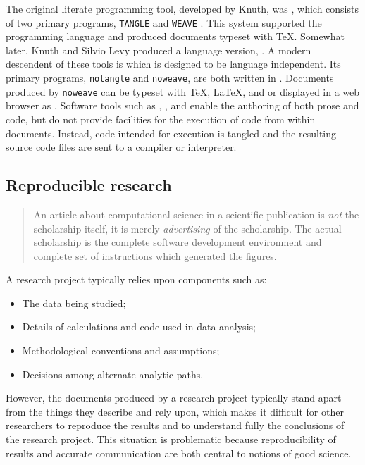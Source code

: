 \documentclass[article,shortnames]{jss}
\begin{document}
The original literate programming tool, developed by Knuth, was ,
which consists of two primary programs, \texttt{TANGLE} and \texttt{WEAVE}
\citep{web}.  This system supported the  programming language
and produced documents typeset with \TeX{}.  Somewhat later, Knuth and
Silvio Levy produced a  language version, 
\citep{knuth94:_cweb_system_struc_docum}.  A modern descendent of
these tools is  \citep{noweb} which is designed to be language
independent.  Its primary programs, \texttt{notangle} and \texttt{noweave}, are both
written in .  Documents produced by \texttt{noweave} can be typeset with
\TeX{}, \LaTeX{}, and  or displayed in a web browser as .
Software tools such as , , and  enable the authoring of
both prose and code, but do not provide facilities for the execution
of code from within documents.  Instead, code intended for execution
is tangled and the resulting source code files are sent to a compiler
or interpreter.
\subsection{Reproducible research}
\label{sec-2-2}

\begin{quote}
An article about computational science in a scientific publication is
\emph{not} the scholarship itself, it is merely \emph{advertising} of the
scholarship.  The actual scholarship is the complete software
development environment and complete set of instructions which
generated the figures.

\end{quote}

A research project typically relies upon components such as:
\begin{itemize}
\item The data being studied;
\item Details of calculations and code used in data analysis;
\item Methodological conventions and assumptions;
\item Decisions among alternate analytic paths.
\end{itemize}

However, the documents produced by a research project typically stand
apart from the things they describe and rely upon, which makes it
difficult for other researchers to reproduce the results and to
understand fully the conclusions of the research project. This
situation is problematic because reproducibility of results and
accurate communication are both central to notions of good science.
\end{document}

